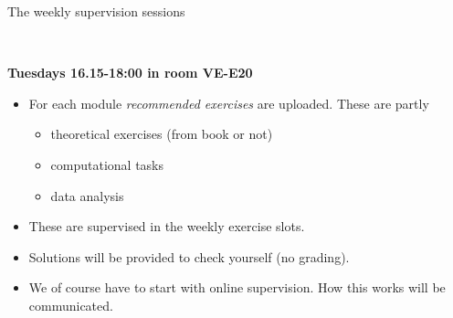 \documentclass[10pt,ignorenonframetext,]{beamer}
\providecommand{\tightlist}{%
  \setlength{\itemsep}{0pt}\setlength{\parskip}{0pt}}
\begin{document}
\begin{frame}

\begin{block}{The weekly supervision sessions}

~

\textbf{Tuesdays 16.15-18:00 in room VE-E20} ~\\
\hspace*{0.333em}

\begin{itemize}
\tightlist
\item
  For each module \emph{recommended exercises} are uploaded. These are
  partly

  \begin{itemize}
  \tightlist
  \item
    theoretical exercises (from book or not)
  \item
    computational tasks
  \item
    data analysis
  \end{itemize}
\end{itemize}

\vspace{2mm}

\begin{itemize}
\tightlist
\item
  These are supervised in the weekly exercise slots.
\end{itemize}

\vspace{2mm}

\begin{itemize}
\tightlist
\item
  Solutions will be provided to check yourself (no grading).
\end{itemize}

\vspace{2mm}

\begin{itemize}
\tightlist
\item
  We of course have to start with online supervision. How this works
  will be communicated.
\end{itemize}

\end{block}

\end{frame}
\end{document}
